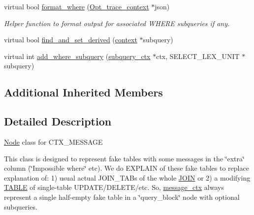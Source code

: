 \begin{DoxyCompactItemize}
\mbox{\label{classopt__explain__json__namespace_1_1message__ctx_aa60f3ccf6692ee9a064459c30c38d23f}} 
virtual bool \mbox{\hyperlink{classopt__explain__json__namespace_1_1message__ctx_aa60f3ccf6692ee9a064459c30c38d23f}{format\+\_\+where}} (\mbox{\hyperlink{classOpt__trace__context}{Opt\+\_\+trace\+\_\+context}} $\ast$json)
\begin{DoxyCompactList}\small\item\em Helper function to format output for associated W\+H\+E\+RE subqueries if any. \end{DoxyCompactList}\item 
virtual bool \mbox{\hyperlink{classopt__explain__json__namespace_1_1message__ctx_a5929254898f69f30b19b4f176a71e3a1}{find\+\_\+and\+\_\+set\+\_\+derived}} (\mbox{\hyperlink{classopt__explain__json__namespace_1_1context}{context}} $\ast$subquery)
\item 
virtual int \mbox{\hyperlink{classopt__explain__json__namespace_1_1message__ctx_ade9097446404901fe19bd29cf0070cd0}{add\+\_\+where\+\_\+subquery}} (\mbox{\hyperlink{classopt__explain__json__namespace_1_1subquery__ctx}{subquery\+\_\+ctx}} $\ast$ctx, S\+E\+L\+E\+C\+T\+\_\+\+L\+E\+X\+\_\+\+U\+N\+IT $\ast$subquery)
\end{DoxyCompactItemize}
\subsection*{Additional Inherited Members}


\subsection{Detailed Description}
\mbox{\hyperlink{classNode}{Node}} class for C\+T\+X\+\_\+\+M\+E\+S\+S\+A\+GE

This class is designed to represent fake tables with some messages in the \char`\"{}extra\char`\"{} column (\char`\"{}\+Impossible where\char`\"{} etc). We do E\+X\+P\+L\+A\+IN of these fake tables to replace explanation of\+: 1) usual actual J\+O\+I\+N\+\_\+\+T\+A\+Bs of the whole \mbox{\hyperlink{classJOIN}{J\+O\+IN}} or 2) a modifying \mbox{\hyperlink{structTABLE}{T\+A\+B\+LE}} of single-\/table U\+P\+D\+A\+T\+E/\+D\+E\+L\+E\+T\+E/etc. So, \mbox{\hyperlink{classopt__explain__json__namespace_1_1message__ctx}{message\+\_\+ctx}} always represent a single half-\/empty fake table in a \char`\"{}query\+\_\+block\char`\"{} node with optional subqueries. 

